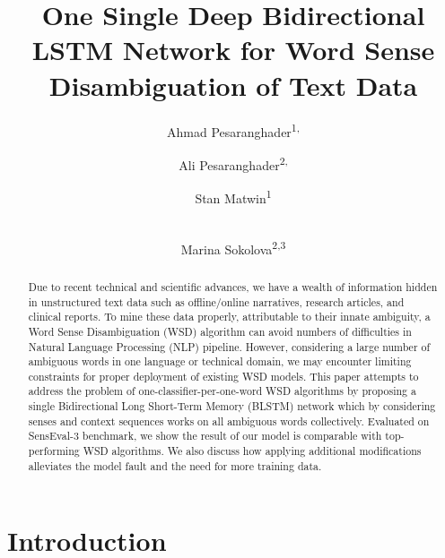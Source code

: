 \documentclass{llncs}
\begin{document}
	
	\title{One Single Deep Bidirectional LSTM Network for Word Sense Disambiguation of Text Data}
\author{Ahmad Pesaranghader\textsuperscript{1,} \and
		Ali Pesaranghader\textsuperscript{2,} \and
		Stan Matwin\textsuperscript{1} \and\\
		Marina Sokolova\textsuperscript{2,3}
	}
	
	
	\maketitle              
\begin{abstract}
Due to recent technical and scientific advances, we have a wealth of information hidden in unstructured text data such as offline/online narratives, research articles, and clinical reports. To mine these data properly, attributable to their innate ambiguity, a Word Sense Disambiguation (WSD) algorithm can avoid numbers of difficulties in Natural Language Processing (NLP) pipeline. However, considering a large number of ambiguous words in one language or technical domain, we may encounter limiting constraints for proper deployment of existing WSD models. This paper attempts to address the problem of one-classifier-per-one-word WSD algorithms by proposing a single Bidirectional Long Short-Term Memory (BLSTM) network which by considering senses and context sequences works on all ambiguous words collectively. Evaluated on SensEval-3 benchmark, we show the result of our model is comparable with top-performing WSD algorithms. We also discuss how applying additional modifications alleviates the model fault and the need for more training data.

\end{abstract}
\section{Introduction}
\end{document}
